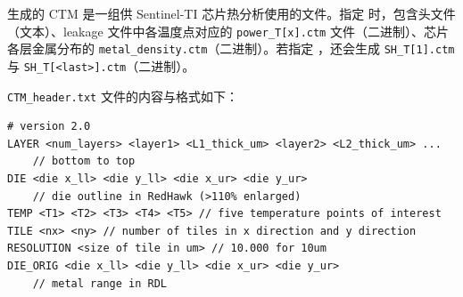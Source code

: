 生成的 CTM 是一组供 Sentinel-TI 芯片热分析使用的文件。指定  时，包含头文件（文本）、leakage 文件中各温度点对应的 \texttt{power\_T[x].ctm} 文件（二进制）、芯片各层金属分布的 \texttt{metal\_density.ctm}（二进制）。若指定 ，还会生成 \texttt{SH\_T[1].ctm} 与 \texttt{SH\_T[<last>].ctm}（二进制）。

\texttt{CTM\_header.txt} 文件的内容与格式如下：
\begin{lstlisting}
# version 2.0
LAYER <num_layers> <layer1> <L1_thick_um> <layer2> <L2_thick_um> ...
    // bottom to top
DIE <die x_ll> <die y_ll> <die x_ur> <die y_ur>
    // die outline in RedHawk (>110% enlarged)
TEMP <T1> <T2> <T3> <T4> <T5> // five temperature points of interest
TILE <nx> <ny> // number of tiles in x direction and y direction
RESOLUTION <size of tile in um> // 10.000 for 10um
DIE_ORIG <die x_ll> <die y_ll> <die x_ur> <die y_ur>
    // metal range in RDL
\end{lstlisting}
